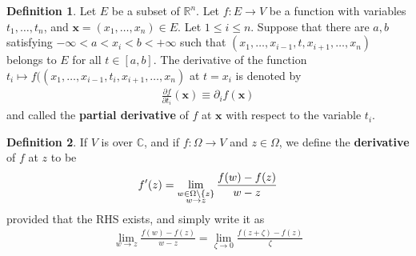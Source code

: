 \documentclass[12pt,b5paper,notitlepage]{article}
\theoremstyle{definition}
\newtheorem{df}{Definition}[section]
\newtheorem{rem}[df]{Remark}
\theoremstyle{plain}
\newcommand{\mbf}{\mathbf}
\newcommand{\Cbb}{\mathbb C}
\newcommand{\Rbb}{\mathbb R}
\newcommand{\dps}{\displaystyle}
\numberwithin{equation}{section}
\begin{document}
\begin{comment}
To simplify subscripts, we write
\begin{align}\label{eq107}
f'(x)=\left\{
\begin{array}{ll}
\dps\lim_{t\rightarrow x}\frac{f(t)-f(x)}{t-x}&\text{ if }a<x<b\\[2ex]
\dps\lim_{t\rightarrow x^+}\frac{f(t)-f(x)}{t-x}&\text{ if }x=a\\[2ex]
\dps\lim_{t\rightarrow x^-}\frac{f(t)-f(x)}{t-x}&\text{ if }x=b
\end{array}
\right.
\end{align}
for the obvious reason. (Recall Def. \ref{lb200}.)

\begin{rem}
Note that in the three cases of \eqref{eq107}, $f'(x)$ can also equals
\begin{align*}
\lim_{h\rightarrow 0}\frac{f(x+h)-f(x)}h\qquad \lim_{h\rightarrow 0^+}\frac{f(x+h)-f(x)}h\qquad \lim_{h\rightarrow 0^-}\frac{f(x+h)-f(x)}h
\end{align*}
\end{rem}

\end{comment}






\begin{df}
Let $E$ be a subset of $\Rbb^n$. Let $f:E\rightarrow V$ be a function with variables $t_1,\dots,t_n$, and $\mbf x=(x_1,\dots,x_n)\in E$. Let $1\leq i\leq n$. Suppose that there are $a,b$ satisfying  $-\infty<a<x_i<b<+\infty$ such that $(x_1,\dots,x_{i-1},t,x_{i+1},\dots,x_n)$ belongs to $E$ for all $t\in[a,b]$. The derivative of the function $t_i\mapsto f((x_1,\dots,x_{i-1},t_i,x_{i+1},\dots,x_n)$ at $t=x_i$ is denoted by
\begin{align*}
\frac{\partial f}{\partial t_i}(\mbf x)\equiv\partial_i f(\mbf x)
\end{align*} 
and called the \textbf{partial derivative}  of $f$ at $\mbf x$ with respect to the variable $t_i$.
\end{df}



\begin{df}
If $V$ is over $\Cbb$, and if $f:\Omega\rightarrow V$ and $z\in\Omega$, we define the \textbf{derivative} of $f$ at $z$ to be
\begin{align*}
f'(z)=\lim_{
\begin{subarray}{c}
w\in\Omega\setminus\{z\}\\
w\rightarrow z
\end{subarray}
}\frac{f(w)-f(z)}{w-z}
\end{align*}
provided that the RHS exists, and simply write it as
\begin{align*}
\lim_{w\rightarrow z}\frac{f(w)-f(z)}{w-z}=\lim_{\zeta\rightarrow0}\frac{f(z+\zeta)-f(z)}\zeta
\end{align*}
\end{df}
\end{document}

